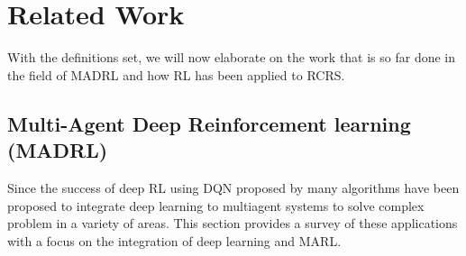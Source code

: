 \documentclass[12pt]{report}
\begin{document}
\chapter{Related Work}

With the definitions set, we will now elaborate on the work that is so far done in the field of MADRL and how RL has been applied to RCRS.

\section{Multi-Agent Deep Reinforcement learning (MADRL)}

Since the success of deep RL using DQN proposed by \cite{Kavukcuoglu} many algorithms have been proposed to integrate deep learning to multiagent systems to solve complex problem in a variety of areas. This section provides a survey of these applications with a focus on the integration of deep learning and MARL. 
\end{document}
